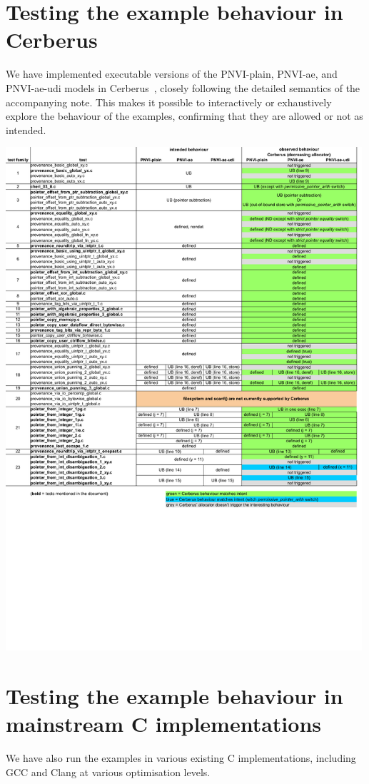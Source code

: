 \documentclass[acmsmall,review,screen]{acmart}\settopmatter{printfolios=true,printccs=false,printacmref=false}
\begin{document}
\newpage
\section{Testing the example behaviour in Cerberus}
We have implemented executable versions of the PNVI-plain, PNVI-ae,
and PNVI-ae-udi models in
Cerberus~\cite{cerberus-popl2019,Cerberus-PLDI16},
closely following the detailed semantics of the accompanying note.
This makes it possible to interactively or exhaustively explore the
behaviour of the examples, confirming that they are allowed or not as
intended.

\noindent
\includegraphics[width=0.99\textwidth]{tests_cerberus.pdf}



\newpage
\section{Testing the example behaviour in mainstream C implementations}
We have also run the examples in various existing C implementations,
including GCC and Clang at various optimisation levels.  
\end{document}
